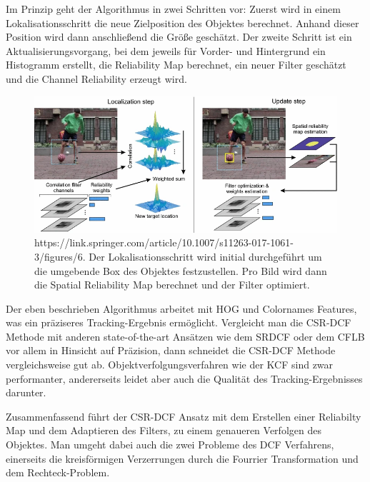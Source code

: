 Im Prinzip geht der Algorithmus in zwei Schritten vor: Zuerst wird in einem Lokalisationsschritt die neue Zielposition des Objektes berechnet. Anhand dieser Position wird dann anschließend die Größe geschätzt. Der zweite Schritt ist ein Aktualisierungsvorgang, bei dem jeweils für Vorder- und Hintergrund ein Histogramm erstellt, die Reliability Map berechnet, ein neuer Filter geschätzt und die Channel Reliability erzeugt wird.

\begin{figure}[h]
    \centering
    \includegraphics{images/CSR_DCF_Localisation_Update.png}
    \caption{https://link.springer.com/article/10.1007/s11263-017-1061-3/figures/6. Der Lokalisationsschritt wird initial durchgeführt um die umgebende Box des Objektes festzustellen. Pro Bild wird dann die Spatial Reliability Map berechnet und der Filter optimiert.}
\end{figure}

Der eben beschrieben Algorithmus arbeitet mit HOG und Colornames \cite{ColornamesFeatures} Features, was ein präziseres Tracking-Ergebnis ermöglicht. Vergleicht man die CSR-DCF Methode mit anderen state-of-the-art Ansätzen wie dem SRDCF \cite{ObjectTrackingSRDCF} oder dem CFLB \cite{ObjectTrackingCFLB} vor allem in Hinsicht auf Präzision, dann schneidet die CSR-DCF Methode vergleichsweise gut ab. Objektverfolgungsverfahren wie der KCF sind zwar performanter, andererseits leidet aber auch die Qualität des Tracking-Ergebnisses darunter.\par
Zusammenfassend führt der CSR-DCF Ansatz mit dem Erstellen einer Reliabilty Map und dem Adaptieren des Filters, zu einem genaueren Verfolgen des Objektes. Man umgeht dabei auch die zwei Probleme des DCF Verfahrens, einerseits die kreisförmigen Verzerrungen durch die Fourrier Transformation und dem Rechteck-Problem. 
